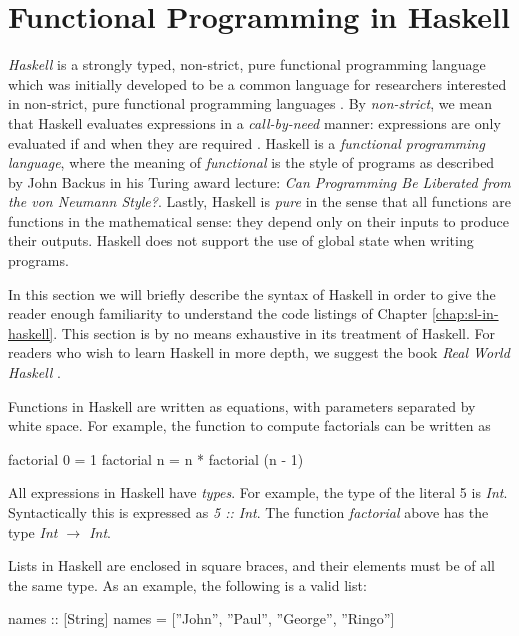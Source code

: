 \documentclass[thesis.tex]{subfiles}
\begin{document}
\section{Functional Programming in Haskell}

\emph{Haskell} is a strongly typed, non-strict, pure functional
programming language \cite{hudak1992report} which was initially
developed to be a common language for researchers interested in
non-strict, pure functional programming languages
\cite{hudak2007history}.
By \emph{non-strict}, we mean that Haskell
evaluates expressions in a \emph{call-by-need} manner: expressions are
only evaluated if and when they are required \cite{henderson1976lazy}. Haskell is a
\emph{functional programming language}, where the meaning of
\emph{functional} is the style of programs as described by John Backus
in his Turing award lecture: \emph{Can Programming Be Liberated from
  the von Neumann Style?}\cite{backus1978can}.  Lastly, Haskell is
\emph{pure} in the sense that all functions are functions in the
mathematical sense: they depend only on their inputs to produce their
outputs. Haskell does not support the use of global state when
writing programs.

In this section we will briefly describe the syntax of Haskell in
order to give the reader enough familiarity to understand the code
listings of Chapter \ref{chap:sl-in-haskell}. This section is by no
means exhaustive in its treatment of Haskell. For readers who wish to
learn Haskell in more depth, we suggest the book \emph{Real World Haskell} \cite{o2008real}.

Functions in Haskell are written as equations, with parameters separated
by white space. For example, the function to compute factorials can be
written as

\begin{spec}
factorial 0 = 1
factorial n = n * factorial (n - 1)
\end{spec}

All expressions in Haskell have \emph{types}. For example, the type of the literal
5 is \emph{Int}. Syntactically this is expressed as \emph{5 :: Int}. The function
\emph{factorial} above has the type \emph{Int $\rightarrow$ Int}.

Lists in Haskell are enclosed in square braces, and their elements must be of all
the same type. As an example, the following is a valid list:

\begin{spec}
names :: [String]
names = [''John'', ''Paul'', ''George'', ''Ringo'']
\end{spec}
\end{document}
